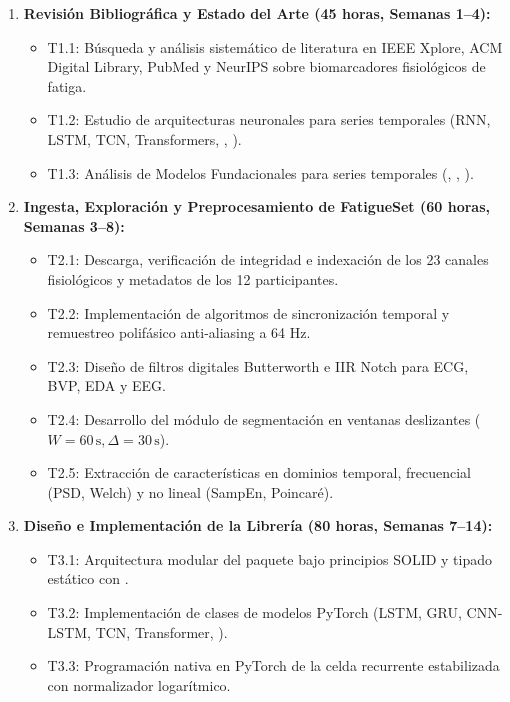 \begin{enumerate}[label=\textbf{WP\arabic*.}, leftmargin=1.8cm]
    \item \textbf{Revisión Bibliográfica y Estado del Arte (45 horas, Semanas 1--4):}
    \begin{itemize}
        \item T1.1: Búsqueda y análisis sistemático de literatura en IEEE Xplore, ACM Digital Library, PubMed y NeurIPS sobre biomarcadores fisiológicos de fatiga.
        \item T1.2: Estudio de arquitecturas neuronales para series temporales (RNN, LSTM, TCN, Transformers, \patchtst{}, \xlstm{}).
        \item T1.3: Análisis de Modelos Fundacionales para series temporales (\moment{}, \chronos{}, \timesfm{}).
    \end{itemize}
    \item \textbf{Ingesta, Exploración y Preprocesamiento de FatigueSet (60 horas, Semanas 3--8):}
    \begin{itemize}
        \item T2.1: Descarga, verificación de integridad e indexación de los 23 canales fisiológicos y metadatos de los 12 participantes.
        \item T2.2: Implementación de algoritmos de sincronización temporal y remuestreo polifásico anti-aliasing a 64 Hz.
        \item T2.3: Diseño de filtros digitales Butterworth e IIR Notch para ECG, BVP, EDA y EEG.
        \item T2.4: Desarrollo del módulo de segmentación en ventanas deslizantes ($W=60\,\text{s}, \Delta=30\,\text{s}$).
        \item T2.5: Extracción de características en dominios temporal, frecuencial (PSD, Welch) y no lineal (SampEn, Poincaré).
    \end{itemize}
    \item \textbf{Diseño e Implementación de la Librería  (80 horas, Semanas 7--14):}
    \begin{itemize}
        \item T3.1: Arquitectura modular del paquete bajo principios SOLID y tipado estático con .
        \item T3.2: Implementación de clases de modelos PyTorch (LSTM, GRU, CNN-LSTM, TCN, Transformer, \patchtst{}).
        \item T3.3: Programación nativa en PyTorch de la celda recurrente estabilizada  con normalizador logarítmico.

\end{itemize}
\end{enumerate}
